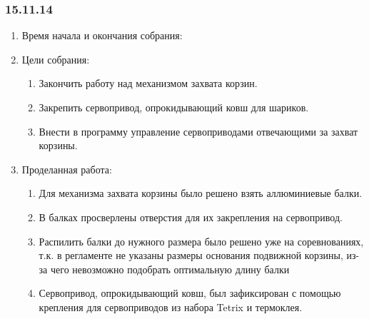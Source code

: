 
\subsubsection{15.11.14}

\begin{enumerate} 
	\item Время начала и окончания собрания:
	
	\item Цели собрания:
	\begin{enumerate}
		\item Закончить работу над механизмом захвата корзин.
		
		\item Закрепить сервопривод, опрокидывающий ковш для шариков.
		
		\item Внести в программу управление сервоприводами отвечающими за захват корзины.
		
	\end{enumerate}
	
	\item Проделанная работа:
	\begin{enumerate}
		\item Для механизма захвата корзины было решено взять аллюминиевые балки. 
		
		\item В балках просверлены отверстия для их закрепления на сервопривод.
		
		\item Распилить балки до нужного размера было решено уже на соревнованиях, т.к. в регламенте не указаны размеры основания подвижной корзины, из-за чего невозможно подобрать оптимальную длину балки 
		
		\item Сервопривод, опрокидывающий ковш, был зафиксирован с помощью крепления для сервоприводов из набора Tetrix и термоклея.
	    \begin{figure}[H]
			\begin{minipage}[h]{0.2\linewidth}
				\center  
			\end{minipage}
			\begin{minipage}[h]{0.6\linewidth}
				\caption{}
			\end{minipage}
		\end{figure}
		

\end{enumerate}
\end{enumerate}
